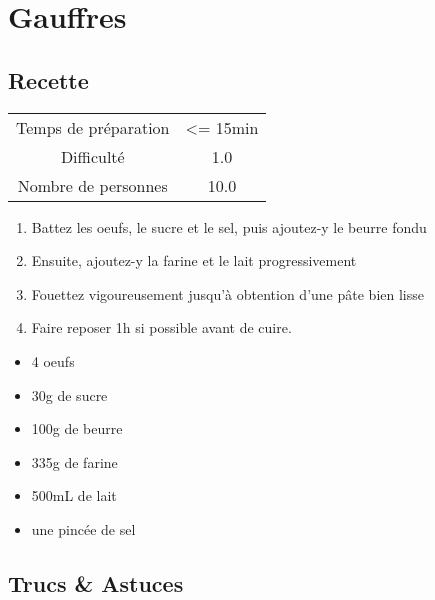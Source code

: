 \newpage
\section{Gauffres}
    \label{sec:Gauffres}
    \subsection{Recette}
    \vspace{1cm}


    \begin{center}
        \begin{tabular}{c|c}
            Temps de préparation & <= 15min \\
            Difficulté & 1.0 \\
            Nombre de personnes & 10.0 
        \end{tabular}
    \end{center}{}

    \vspace{1cm}
    \hline
    \vspace{1cm}

    \begin{minipage}{.7\textwidth}
        \begin{enumerate}
            \item Battez les oeufs, le sucre et le sel, puis ajoutez-y le beurre fondu
	    \item Ensuite, ajoutez-y la farine et le lait progressivement
	    \item Fouettez vigoureusement jusqu'à obtention d'une pâte bien lisse
	    \item Faire reposer 1h si possible avant de cuire.

        \end{enumerate}
    \end{minipage}
    \begin{minipage}{.3\textwidth}
        \begin{flushleft}
        \begin{itemize}
            \item 4 oeufs
	    \item 30g de sucre
	    \item 100g de beurre
	    \item 335g de farine
	    \item 500mL de lait
	    \item une pincée de sel

        \end{itemize}
        \end{flushleft}
    \end{minipage}
    
    \vspace{1cm}
    \hline
    \vspace{1cm}
    
    \subsection{Trucs \& Astuces}
        
